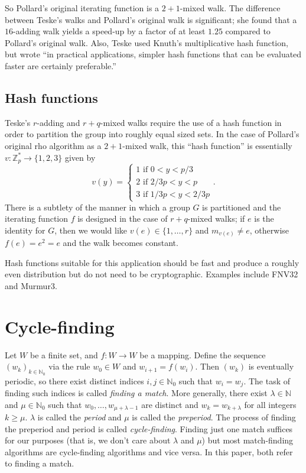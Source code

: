 \documentclass{article}
\newcommand{\ZZ}{\mathbb{Z}}
\newcommand{\NN}{\mathbb{N}}
\begin{document}
So Pollard's original iterating function is a $2+1$-mixed walk. The difference between Teske's walks and Pollard's original walk is significant; she found that a $16$-adding walk yields a speed-up by a factor of at least $1.25$ compared to Pollard's original walk. Also, Teske used Knuth's multiplicative hash function, but wrote ``in practical applications, simpler hash functions that can be evaluated faster are certainly preferable.''

\subsection{Hash functions}

Teske's $r$-adding and $r+q$-mixed walks require the use of a hash function in order to partition the group into roughly equal sized sets. In the case of Pollard's original rho algorithm as a $2+1$-mixed walk, this ``hash function'' is essentially $v: \ZZ_p^* \to \{1,2,3\}$ given by
$$v(y) = \begin{cases}
	1 \text{ if } 0 < y < p/3 \\
	2 \text{ if } 2/3p < y < p \\
	3 \text{ if } 1/3p < y < 2/3p
\end{cases}.$$
There is a subtlety of the manner in which a group $G$ is partitioned and the iterating function $f$ is designed in the case of $r+q$-mixed walks; if $e$ is the identity for $G$, then we would like $v(e) \in \{1,\ldots,r\}$ and $m_{v(e)} \neq e$, otherwise $f(e)=e^2=e$ and the walk becomes constant.

Hash functions suitable for this application should be fast and produce a roughly even distribution but do not need to be cryptographic. Examples include FNV32 and Murmur3.

\section{Cycle-finding}

Let $W$ be a finite set, and $f: W \to W$ be a mapping. Define the sequence $(w_k)_{k \in \NN_0}$ via the rule $w_0 \in W$ and $w_{i+1} = f(w_i)$. Then $(w_k)$ is eventually periodic, so there exist distinct indices $i,j \in \NN_0$ such that $w_i=w_j$. The task of finding such indices is called \textit{finding a match}. More generally, there exist $\lambda \in \NN$ and $\mu \in \NN_0$ such that $w_0,\ldots,w_{\mu + \lambda - 1}$ are distinct and $w_k = w_{k+\lambda}$ for all integers $k \geq \mu$. $\lambda$ is called the \textit{period} and $\mu$ is called the \textit{preperiod}. The process of finding the preperiod and period is called \textit{cycle-finding}. Finding just one match suffices for our purposes (that is, we don't care about $\lambda$ and $\mu$) but most match-finding algorithms are cycle-finding algorithms and vice versa. In this paper, both refer to finding a match.
\end{document}
